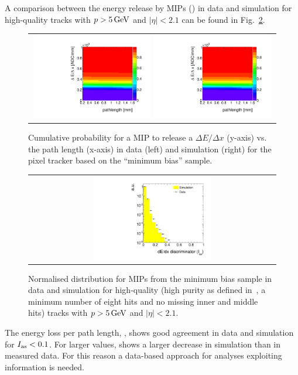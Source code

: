 A comparison between the energy release by MIPs (\ias) in data and simulation for high-quality tracks with $p>5\,\text{Ge}\kern-0.06667em\text{V}$ and $|\eta|<2.1$ can be found in Fig.~\ref{fig:Data-MC-Dedx_MIPs}.
\begin{figure}[!b]
  \centering 
  \begin{tabular}{c}
    \includegraphics[width=0.49\textwidth]{figures/analysis_2/PixelCalibration/Discriminator_template_data_pixel_2012.pdf}
    \includegraphics[width=0.49\textwidth]{figures/analysis_2/PixelCalibration/Discriminator_template_mc_pixel_2012.pdf}
  \end{tabular}
  \caption{Cumulative probability for a MIP to release a $\Delta E/ \Delta x$ (y-axis) vs. the path length (x-axis) in data (left) and simulation (right) for the pixel tracker based on the ``minimum bias'' sample.}
  \label{fig:ProbabilityTemplate}
\end{figure}
\begin{figure}[!bt]
  \centering 
  \begin{tabular}{c}
    \includegraphics[width=0.49\textwidth]{figures/analysis_2/PixelCalibration/htrackASmiSmallRange_log_MIPs.pdf}
  \end{tabular}
  \caption{Normalised \ias distribution for MIPs from the minimum bias sample in data and simulation for high-quality (high purity as defined in~\cite{bib:CMS:Tracking_2010}, a minimum number of eight hits and no missing inner and middle hits) tracks with $p>5\,\text{Ge}\kern-0.06667em\text{V}$ and $|\eta|<2.1$.}
  \label{fig:Data-MC-Dedx_MIPs}
\end{figure}
The energy loss per path length, \dedx, shows good agreement in data and simulation for $I_{\text{as}}<0.1$.
For larger values, \ias shows a larger decrease in simulation than in measured data.
For this reason a data-based approach for analyses exploiting \dedx information is needed.\\

